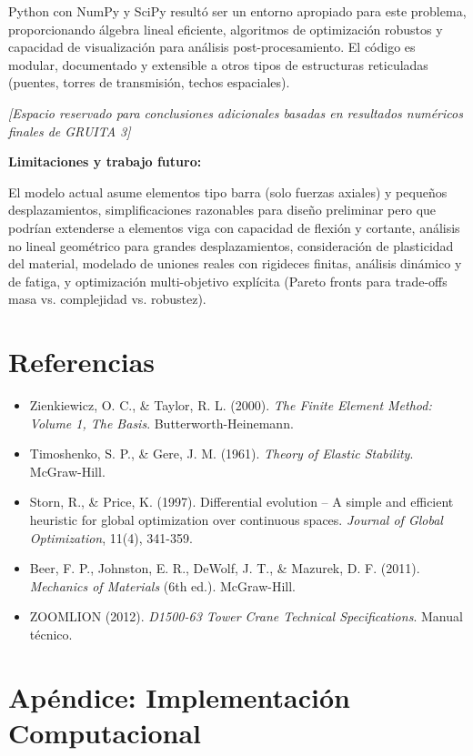 \documentclass[10pt,a4paper]{article}
\begin{document}
Python con NumPy y SciPy resultó ser un entorno apropiado para este problema, proporcionando álgebra lineal eficiente, algoritmos de optimización robustos y capacidad de visualización para análisis post-procesamiento. El código es modular, documentado y extensible a otros tipos de estructuras reticuladas (puentes, torres de transmisión, techos espaciales).

\vspace{0.5cm}

\textit{[Espacio reservado para conclusiones adicionales basadas en resultados numéricos finales de GRUITA 3]}

\vspace{0.3cm}

\textbf{Limitaciones y trabajo futuro:}

El modelo actual asume elementos tipo barra (solo fuerzas axiales) y pequeños desplazamientos, simplificaciones razonables para diseño preliminar pero que podrían extenderse a elementos viga con capacidad de flexión y cortante, análisis no lineal geométrico para grandes desplazamientos, consideración de plasticidad del material, modelado de uniones reales con rigideces finitas, análisis dinámico y de fatiga, y optimización multi-objetivo explícita (Pareto fronts para trade-offs masa vs. complejidad vs. robustez).

\section*{Referencias}
\small
\begin{itemize}
\item Zienkiewicz, O. C., \& Taylor, R. L. (2000). \textit{The Finite Element Method: Volume 1, The Basis}. Butterworth-Heinemann.
\item Timoshenko, S. P., \& Gere, J. M. (1961). \textit{Theory of Elastic Stability}. McGraw-Hill.
\item Storn, R., \& Price, K. (1997). Differential evolution – A simple and efficient heuristic for global optimization over continuous spaces. \textit{Journal of Global Optimization}, 11(4), 341-359.
\item Beer, F. P., Johnston, E. R., DeWolf, J. T., \& Mazurek, D. F. (2011). \textit{Mechanics of Materials} (6th ed.). McGraw-Hill.
\item ZOOMLION (2012). \textit{D1500-63 Tower Crane Technical Specifications}. Manual técnico.
\end{itemize}

\appendix
\section*{Apéndice: Implementación Computacional}
\end{document}
